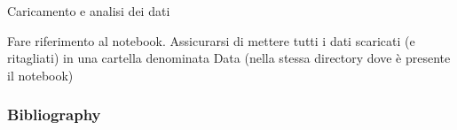 \documentclass{beamer}
\begin{document}
\begin{frame}{Caricamento e analisi dei dati}
\begin{center}
Fare riferimento al notebook. Assicurarsi di mettere tutti i dati scaricati (e ritagliati) in una cartella denominata Data (nella stessa directory dove è presente il notebook)
\end{center}
\end{frame}





\begin{frame}[t,allowframebreaks]
\frametitle{Bibliography}
\printbibliography
\end{frame}
\end{document}
